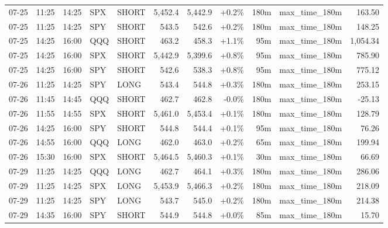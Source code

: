 \documentclass[11pt,a4paper,twoside]{article}
\begin{document}
\begin{center}
\begin{longtable}{>{\color{txtmain}}l l l l l r r r r >{\color{txtmain}}l r}
07-25 & 11:25 & 14:25 & SPX & SHORT & 5,452.4 & 5,442.9 & \textcolor{wingreen}{+0.2\%} & 180m & max\_time\_180m & \textcolor{wingreen}{163.50} \\
07-25 & 11:25 & 14:25 & SPY & SHORT & 543.5 & 542.6 & \textcolor{wingreen}{+0.2\%} & 180m & max\_time\_180m & \textcolor{wingreen}{148.25} \\
07-25 & 14:25 & 16:00 & QQQ & SHORT & 463.2 & 458.3 & \textcolor{wingreen}{+1.1\%} & 95m & max\_time\_180m & \textcolor{wingreen}{1,054.34} \\
07-25 & 14:25 & 16:00 & SPX & SHORT & 5,442.9 & 5,399.6 & \textcolor{wingreen}{+0.8\%} & 95m & max\_time\_180m & \textcolor{wingreen}{785.90} \\
07-25 & 14:25 & 16:00 & SPY & SHORT & 542.6 & 538.3 & \textcolor{wingreen}{+0.8\%} & 95m & max\_time\_180m & \textcolor{wingreen}{775.12} \\
07-26 & 11:25 & 14:25 & SPY & LONG & 543.4 & 544.8 & \textcolor{wingreen}{+0.3\%} & 180m & max\_time\_180m & \textcolor{wingreen}{253.15} \\
07-26 & 11:45 & 14:45 & QQQ & SHORT & 462.7 & 462.8 & \textcolor{lossred}{-0.0\%} & 180m & max\_time\_180m & \textcolor{lossred}{-25.13} \\
07-26 & 11:55 & 14:55 & SPX & SHORT & 5,461.0 & 5,453.4 & \textcolor{wingreen}{+0.1\%} & 180m & max\_time\_180m & \textcolor{wingreen}{128.79} \\
07-26 & 14:25 & 16:00 & SPY & SHORT & 544.8 & 544.4 & \textcolor{wingreen}{+0.1\%} & 95m & max\_time\_180m & \textcolor{wingreen}{76.26} \\
07-26 & 14:55 & 16:00 & QQQ & LONG & 462.0 & 463.0 & \textcolor{wingreen}{+0.2\%} & 65m & max\_time\_180m & \textcolor{wingreen}{199.94} \\
07-26 & 15:30 & 16:00 & SPX & SHORT & 5,464.5 & 5,460.3 & \textcolor{wingreen}{+0.1\%} & 30m & max\_time\_180m & \textcolor{wingreen}{66.69} \\
07-29 & 11:25 & 14:25 & QQQ & LONG & 462.7 & 464.1 & \textcolor{wingreen}{+0.3\%} & 180m & max\_time\_180m & \textcolor{wingreen}{286.06} \\
07-29 & 11:25 & 14:25 & SPX & LONG & 5,453.9 & 5,466.3 & \textcolor{wingreen}{+0.2\%} & 180m & max\_time\_180m & \textcolor{wingreen}{218.09} \\
07-29 & 11:25 & 14:25 & SPY & LONG & 543.7 & 545.0 & \textcolor{wingreen}{+0.2\%} & 180m & max\_time\_180m & \textcolor{wingreen}{214.38} \\
07-29 & 14:35 & 16:00 & SPY & SHORT & 544.9 & 544.8 & \textcolor{wingreen}{+0.0\%} & 85m & max\_time\_180m & \textcolor{wingreen}{15.70} \\

\end{longtable}
\end{center}
\end{document}
